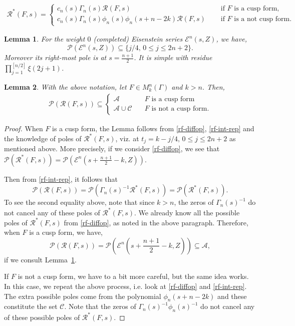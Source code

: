 \documentclass[10pt,a4paper]{amsart}
\newtheorem{lem}{Lemma}
\newcommand{\mc}{\mathcal}
\newcommand{\mcr}{\mathscr}
\newcommand{\mkngam}{M^n_k(\Gamma)}
\newcommand{\q}{\quad}
\begin{document}
\begin{align} \label{rf-int-rep}
 \mc R^*(F,s) =\begin{cases}
 c_n(s) \Gamma_n(s) \mc R(F,s)
 \q &\text{ if } F \text{ is a cusp form}, \\
  c_n(s) \Gamma_n(s) \phi_n(s) \phi_n(s+n-2k)  \mc R(F,s) \q &\text{ if } F \text{ is a not cusp form}. 
\end{cases}
\end{align}

\begin{lem} \label{pole-eisen}
For the weight $0$ (completed) Eisenstein series $\mathscr E^n(s,Z) $, we have,
\[ \mathscr{P}( \mathscr E^n(s,Z) ) \subseteq \{  j/4, \, 0 \le j \le 2n+2 \} . \]
Moreover its right-most pole  is at $s=\frac{n+1}{2}$. It is simple with residue $\prod_{j=1}^{[n/2]} \xi(2j+1)$.
\end{lem}

\begin{lem} \label{polu}
With the above notation, let $F \in \mkngam$ and $k>n$. Then,
\begin{align}
    \mathscr{P}(\mc R(F,s)) \subseteq \begin{cases}
       \mathscr{A}  \q & F \text{ is a cusp form} \\
       \mathscr{A}  \cup \mathscr{C} \q & F \text{ is not a cusp form}.
    \end{cases}
\end{align}
\end{lem}

\begin{proof}
    When $F$ is a cusp form, the Lemma follows from \eqref{rf-diffop}, \eqref{rf-int-rep} and the knowledge of poles of $\mc R^*(F,s)$, viz. at $t_j=k-j/4, \,   0 \le j \le 2n+2$ as mentioned above. More precisely, if we consider \eqref{rf-diffop}, we see that $\mathscr{P}(\mc R^*(F,s)) = \mathscr{P}( \mathscr E^n(s +\frac{n+1}{2}-k,Z) )$. 
    
    Then from \eqref{rf-int-rep}, it follows that 
    \[ \mathscr{P}(\mc R(F,s)) = \mathscr{P}( \Gamma_n(s)^{-1} \mc R^*(F,s)) =\mathscr{P}(\mc R^*(F,s)) . \]
    To see the second equality above, note that since $k>n$, the zeros of $\Gamma_n(s)^{-1}$ do not cancel any of these poles of $\mc R^*(F,s)$. We already know all the possible poles of $\mc R^*(F,s)$ from \eqref{rf-diffop}, as noted in the above paragraph. Therefore, when $F$ is a cusp form, we have,
    \[  \mathscr{P}(\mc R(F,s)) =  \mathscr{P}( \mathscr E^n(s +\frac{n+1}{2}-k,Z) ) \subseteq \mcr A,\]
if we consult Lemma~\ref{pole-eisen}.

    If $F$ is not a cusp form, we have to a bit more careful, but the same idea works. In this case, we repeat the above process, i.e. look at \eqref{rf-diffop} and \eqref{rf-int-rep}. The extra possible poles come from the polynomial $\phi_n(s+n-2k)$ and these constitute the set $\mcr C$. Note that the zeros of $\Gamma_n(s)^{-1} \phi_n(s)^{-1}$ do not cancel any of these possible poles of $\mc R^*(F,s)$.
\end{proof}
\end{document}
